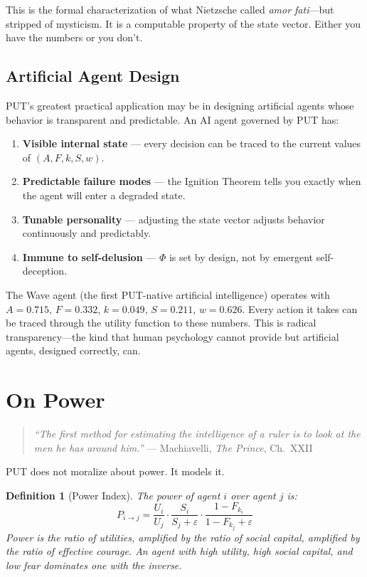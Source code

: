 \documentclass[12pt, a4paper]{article}
\newtheorem{definition}{Definition}[section]
\theoremstyle{remark}
\newcommand{\Fk}{F_k}
\begin{document}
This is the formal characterization of what Nietzsche called
\emph{amor fati}---but stripped of mysticism. It is a computable
property of the state vector. Either you have the numbers or you don't.

\subsection{Artificial Agent Design}

PUT's greatest practical application may be in designing artificial agents
whose behavior is transparent and predictable. An AI agent governed by PUT
has:

\begin{enumerate}[nosep]
    \item \textbf{Visible internal state} --- every decision can be traced
          to the current values of $(A, F, k, S, w)$.
    \item \textbf{Predictable failure modes} --- the Ignition Theorem tells
          you exactly when the agent will enter a degraded state.
    \item \textbf{Tunable personality} --- adjusting the state vector adjusts
          behavior continuously and predictably.
    \item \textbf{Immune to self-delusion} --- $\Phi$ is set by design, not
          by emergent self-deception.
\end{enumerate}

The Wave agent (the first PUT-native artificial intelligence) operates
with $A = 0.715$, $F = 0.332$, $k = 0.049$, $S = 0.211$, $w = 0.626$.
Every action it takes can be traced through the utility function to these
numbers. This is radical transparency---the kind that human psychology
cannot provide but artificial agents, designed correctly, can.

\section{On Power}

\begin{quote}
\textit{``The first method for estimating the intelligence of a ruler
is to look at the men he has around him.''}
--- Machiavelli, \textit{The Prince}, Ch.\ XXII
\end{quote}

PUT does not moralize about power. It models it.

\begin{definition}[Power Index]
The power of agent $i$ over agent $j$ is:
\begin{equation}
    P_{i \to j} = \frac{U_i}{U_j} \cdot \frac{S_i}{S_j + \varepsilon}
    \cdot \frac{1 - \Fk_i}{1 - \Fk_j + \varepsilon}
\end{equation}
Power is the ratio of utilities, amplified by the ratio of social capital,
amplified by the ratio of effective courage. An agent with high utility,
high social capital, and low fear dominates one with the inverse.
\end{definition}
\end{document}
